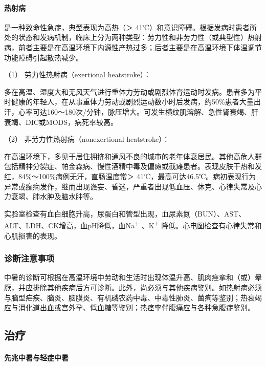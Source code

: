\paragraph{热射病}

是一种致命性急症，典型表现为高热（＞
41℃）和意识障碍。根据发病时患者所处的状态和发病机制，临床上分为两种类型：劳力性和非劳力性（或典型性）热射病，前者主要是在高温环境下内源性产热过多；后者主要是在高温环境下体温调节功能障碍引起散热减少。

\hypertarget{text00354.htmlux5cux23CHP15-1-2-1-3-3-1}{}
（1） 劳力性热射病（exertional heatstroke）：

多在高温、湿度大和无风天气进行重体力劳动或剧烈体育运动时发病。患者多为平时健康的年轻人，在从事重体力劳动或剧烈运动数小时后发病，约50\%患者大量出汗，心率可达160～180次/分钟，脉压增大。可发生横纹肌溶解、急性肾衰竭、肝衰竭、DIC或MODS，病死率较高。

\hypertarget{text00354.htmlux5cux23CHP15-1-2-1-3-3-2}{}
（2） 非劳力性热射病（nonexertional heatstroke）：

在高温环境下，多见于居住拥挤和通风不良的城市的老年体衰居民。其他高危人群包括精神分裂症、帕金森病、慢性酒精中毒及偏瘫或截瘫患者。表现皮肤干热和发红，84\%～100\%病例无汗，直肠温度常＞
41℃，最高可达46.5℃。病初表现行为异常或癫痫发作，继而出现谵妄、昏迷，严重者出现低血压、休克、心律失常及心力衰竭、肺水肿及脑水肿等。

实验室检查有血白细胞升高，尿蛋白和管型出现，血尿素氮（BUN）、AST、ALT、LDH、CK增高，血pH降低，血Na\textsuperscript{+}
、K\textsuperscript{+} 降低。心电图检查有心律失常和心肌损害的表现。

\subsubsection{诊断注意事项}

中暑的诊断可根据在高温环境中劳动和生活时出现体温升高、肌肉痉挛和（或）晕厥，并应排除其他疾病后方可诊断。此外，尚必须与其他疾病鉴别。如热射病必须与脑型疟疾、脑炎、脑膜炎、有机磷农药中毒、中毒性肺炎、菌痢等鉴别；热衰竭应与消化道出血或宫外孕、低血糖等鉴别；热痉挛伴腹痛应与各种急腹症鉴别。

\subsection{治疗}

\paragraph{先兆中暑与轻症中暑}

